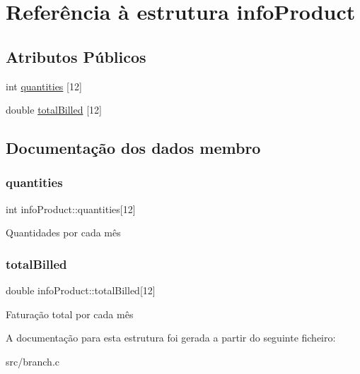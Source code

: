 \hypertarget{structinfoProduct}{}\section{Referência à estrutura info\+Product}
\label{structinfoProduct}
\subsection*{Atributos Públicos}
\begin{DoxyCompactItemize}
\item 
int \hyperlink{structinfoProduct_a47dacd5cd627b262bdaeb2250dc52b64}{quantities} \mbox{[}12\mbox{]}
\item 
double \hyperlink{structinfoProduct_abeeb77cc7048698bc808a33d78837df3}{total\+Billed} \mbox{[}12\mbox{]}
\end{DoxyCompactItemize}


\subsection{Documentação dos dados membro}
\mbox{\label{structinfoProduct_a47dacd5cd627b262bdaeb2250dc52b64}} 
\subsubsection{\texorpdfstring{quantities}{quantities}}
{\footnotesize\ttfamily int info\+Product\+::quantities\mbox{[}12\mbox{]}}

Quantidades por cada mês \mbox{\label{structinfoProduct_abeeb77cc7048698bc808a33d78837df3}} 
\subsubsection{\texorpdfstring{total\+Billed}{totalBilled}}
{\footnotesize\ttfamily double info\+Product\+::total\+Billed\mbox{[}12\mbox{]}}

Faturação total por cada mês 

A documentação para esta estrutura foi gerada a partir do seguinte ficheiro\+:\begin{DoxyCompactItemize}
\item 
src/branch.\+c\end{DoxyCompactItemize}
